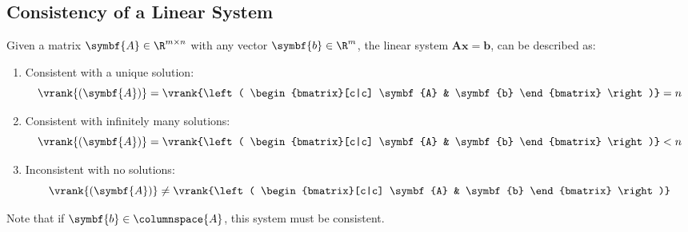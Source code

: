 \documentclass{article}
\begin{document}
\subsection{Consistency of a Linear System}
Given a matrix \(\symbf{A} \in \R^{m \times n}\) with any vector
\(\symbf{b} \in \R^m\), the linear system \(\symbf{A}\symbf{x} =
\symbf{b}\), can be described as:
\begin{enumerate}
    \item Consistent with a unique solution:
          \begin{equation*}
              \vrank{\left( \symbf{A} \right)} =
              \vrank{\left(
                  \begin{bmatrix}[c|c]
                      \symbf{A} & \symbf{b}
                  \end{bmatrix}
                  \right)} = n
          \end{equation*}
    \item Consistent with infinitely many solutions:
          \begin{equation*}
              \vrank{\left( \symbf{A} \right)} =
              \vrank{\left(
                  \begin{bmatrix}[c|c]
                      \symbf{A} & \symbf{b}
                  \end{bmatrix}
                  \right)} < n
          \end{equation*}
    \item Inconsistent with no solutions:
          \begin{equation*}
              \vrank{\left( \symbf{A} \right)} \neq
              \vrank{\left(
                  \begin{bmatrix}[c|c]
                      \symbf{A} & \symbf{b}
                  \end{bmatrix}
                  \right)}
          \end{equation*}
\end{enumerate}
Note that if \(\symbf{b} \in \columnspace{{A}}\), this system must be
consistent.
\end{document}
